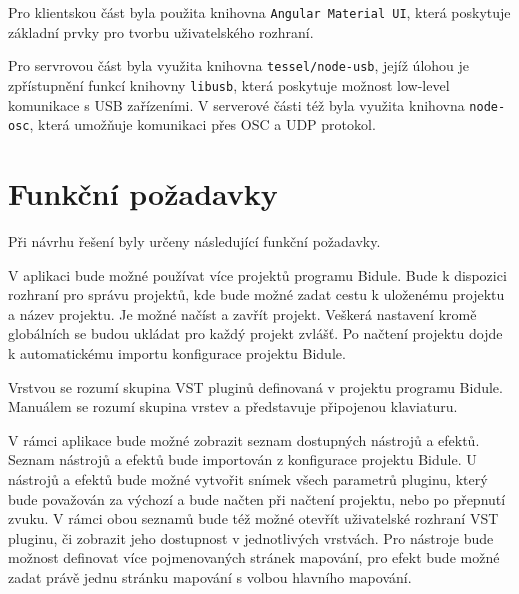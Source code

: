 \documentclass[thesis=M,czech]{FITthesis}[2019/03/06]
\begin{document}
		Pro klientskou část byla použita knihovna \texttt{Angular Material UI}, která poskytuje základní prvky pro tvorbu uživatelského rozhraní.

		Pro servrovou část byla využita knihovna \texttt{tessel/node-usb}, jejíž úlohou je zpřístupnění funkcí knihovny \texttt{libusb}, která poskytuje možnost low-level komunikace s USB zařízeními\cite{libusb}.
		V serverové části též byla využita knihovna \texttt{node-osc}, která umožňuje komunikaci přes OSC a UDP protokol.
		
	\section{Funkční požadavky}
		Při návrhu řešení byly určeny následující funkční požadavky.
	
		V aplikaci bude možné používat více projektů programu Bidule. Bude k dispozici rozhraní pro správu projektů, kde bude možné
		zadat cestu k uloženému projektu a název projektu. Je možné načíst a zavřít projekt. Veškerá nastavení kromě globálních se budou ukládat 
		pro každý projekt zvlášť. Po načtení projektu dojde k automatickému importu konfigurace projektu Bidule.
		
		Vrstvou se rozumí skupina VST pluginů definovaná v projektu programu Bidule. Manuálem se rozumí skupina vrstev a představuje připojenou klaviaturu.

		V rámci aplikace bude možné zobrazit seznam dostupných nástrojů a efektů. Seznam nástrojů a efektů bude importován z konfigurace projektu Bidule.
		U nástrojů a efektů bude možné vytvořit snímek všech parametrů pluginu, který bude považován za výchozí a bude načten při načtení projektu, nebo po přepnutí zvuku. V rámci obou seznamů bude též možné otevřít uživatelské rozhraní VST pluginu, či zobrazit jeho dostupnost v jednotlivých vrstvách. Pro nástroje bude možnost definovat více pojmenovaných stránek mapování, pro efekt bude možné zadat právě jednu stránku mapování s volbou hlavního mapování.
\end{document}
